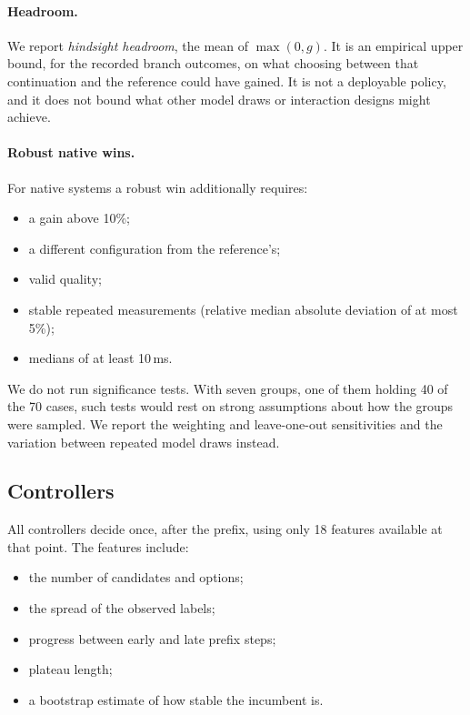 \paragraph{Headroom.} We report \emph{hindsight headroom}, the mean of $\max(0, g)$. It is an empirical upper bound, for the recorded branch outcomes, on what choosing between that continuation and the reference could have gained. It is not a deployable policy, and it does not bound what other model draws or interaction designs might achieve.

\paragraph{Robust native wins.} For native systems a robust win additionally requires:
\begin{itemize}
  \item a gain above 10\%;
  \item a different configuration from the reference's;
  \item valid quality;
  \item stable repeated measurements (relative median absolute deviation of at most 5\%);
  \item medians of at least 10\,ms.
\end{itemize}

We do not run significance tests. With seven groups, one of them holding 40 of the 70 cases, such tests would rest on strong assumptions about how the groups were sampled. We report the weighting and leave-one-out sensitivities and the variation between repeated model draws instead.

\subsection{Controllers}

All controllers decide once, after the prefix, using only 18 features available at that point. The features include:
\begin{itemize}
  \item the number of candidates and options;
  \item the spread of the observed labels;
  \item progress between early and late prefix steps;
  \item plateau length;
  \item a bootstrap estimate of how stable the incumbent is.
\end{itemize}

